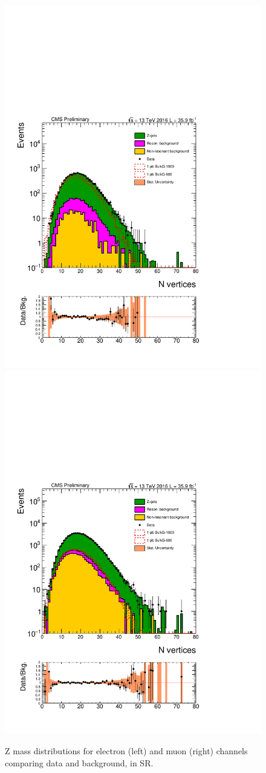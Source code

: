 \begin{figure}[htbp!]
\centering
\includegraphics[width=0.46\linewidth,page=8]{figures/ReMiniSummer16_DT_PhReMiniMCRcFixXsec_GMCPhPtWt_SRdPhiGT0p5_puWeightsummer16_muoneg_gjet_metfilter_unblind_el_log_1pb.pdf}
\includegraphics[width=0.46\linewidth,page=8]{figures/ReMiniSummer16_DT_PhReMiniMCRcFixXsec_GMCPhPtWt_SRdPhiGT0p5_puWeightsummer16_muoneg_gjet_metfilter_unblind_mu_log_1pb.pdf}
\caption{Z mass distributions for electron (left) and muon (right) channels
comparing data and background, in SR.}
\label{fit:SR_gjet_mz}
\end{figure}

